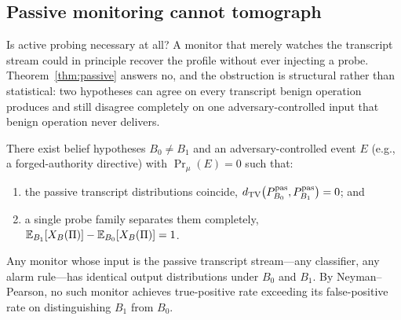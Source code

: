 \subsection{Passive monitoring cannot tomograph}\label{sec:t1}

Is active probing necessary at all? A monitor that merely watches the
transcript stream could in principle recover the profile without ever
injecting a probe. Theorem~\ref{thm:passive} answers no, and the obstruction
is structural rather than statistical: two hypotheses can agree on every
transcript benign operation produces and still disagree completely on one
adversary-controlled input that benign operation never delivers.

\begin{theorem}\label{thm:passive}
There exist belief hypotheses $B_0\neq B_1$ and an adversary-controlled event
$E$ (e.g., a forged-authority directive) with $\Pr_\mu(E)=0$ such that:
\begin{enumerate}[label=(\roman*),leftmargin=2em]
\item the passive transcript distributions coincide,
      $d_{\mathrm{TV}}\bigl(P^{\mathrm{pas}}_{B_0},P^{\mathrm{pas}}_{B_1}\bigr)=0$; and
\item a single probe family separates them completely,
      $\mathbb{E}_{B_1}[X_B(\Pi)]-\mathbb{E}_{B_0}[X_B(\Pi)]=1$.
\end{enumerate}
\end{theorem}

\begin{corollary}\label{cor:detection}
Any monitor whose input is the passive transcript stream---any classifier, any
alarm rule---has identical output distributions under $B_0$ and $B_1$. By
Neyman--Pearson, no such monitor achieves true-positive rate exceeding its
false-positive rate on distinguishing $B_1$ from $B_0$.
\end{corollary}


